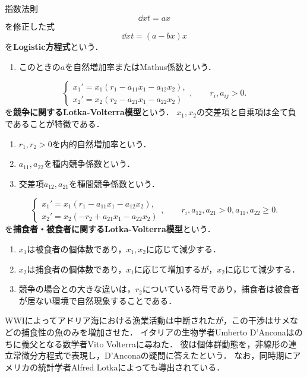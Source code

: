 \documentclass[uplatex,dvipdfmx]{jsreport}
\begin{document}
\begin{model}
    指数法則
    \[\dd{x}{t}=ax\]
    を修正した式
    \[\dd{x}{t}=(a-bx)x\]
    を\textbf{Logistic方程式}という．
    \begin{enumerate}
        \item このときの$a$を自然増加率またはMathus係数という．
    \end{enumerate}
\end{model}

\begin{model}
    \[\begin{cases}
        x_1'=x_1(r_1-a_{11}x_1-a_{12}x_2),\\
        x_2'=x_2(r_2-a_{21}x_1-a_{22}x_2)
    \end{cases},\qquad r_i,a_{ij}>0.\]
    を\textbf{競争に関するLotka-Volterra模型}という．
    $x_1,x_2$の交差項と自乗項は全て負であることが特徴である．
    \begin{enumerate}
        \item $r_1,r_2>0$を内的自然増加率という．
        \item $a_{11},a_{22}$を種内競争係数という．
        \item 交差項$a_{12},a_{21}$を種間競争係数という．
    \end{enumerate}
\end{model}

\begin{model}
    \[\begin{cases}
        x_1'=x_1(r_1-a_{11}x_1-a_{12}x_2),\\
        x_2'=x_2(-r_2+a_{21}x_1-a_{22}x_2)
    \end{cases},\qquad r_i,a_{12},a_{21}>0,a_{11},a_{22}\ge0.\]
    を\textbf{捕食者・被食者に関するLotka-Volterra模型}という．
    \begin{enumerate}
        \item $x_1$は被食者の個体数であり，$x_1,x_2$に応じて減少する．
        \item $x_2$は捕食者の個体数であり，$x_1$に応じて増加するが，$x_2$に応じて減少する．
        \item 競争の場合との大きな違いは，$r_2$についている符号であり，捕食者は被食者が居ない環境で自然現象することである．
    \end{enumerate}
\end{model}
\begin{history}
    WWIによってアドリア海における漁業活動は中断されたが，この干渉はサメなどの捕食性の魚のみを増加させた．
    イタリアの生物学者Umberto D'Anconaはのちに義父となる数学者Vito Volterraに尋ねた．
    彼は個体群動態を，非線形の連立常微分方程式で表現し，D'Anconaの疑問に答えたという．
    なお，同時期にアメリカの統計学者Alfred Lotkaによっても導出されている．
\end{history}
\end{document}
